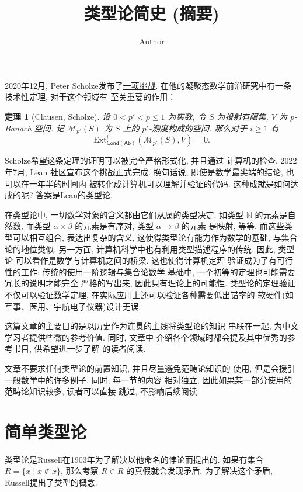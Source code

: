 \documentclass[UTF8, zihao=-4]{ctexart}
\title{类型论简史 (摘要)}
\date{}
\author{Author}
\theoremstyle{plain}
\newtheorem*{theorem}{定理}
\theoremstyle{definition}
\theoremstyle{remark}
\begin{document}
\maketitle

2020年12月, Peter Scholze发布了\href{https://xenaproject.wordpress.com/2020/12/05/liquid-tensor-experiment/}{一项挑战}.
在他的凝聚态数学前沿研究中有一条技术性定理, 对于这个领域有
至关重要的作用：
\begin{theorem}[Clausen, Scholze]
设 \(0 < p' < p \le 1\) 为实数, 令 \(S\) 为投射有限集,
\(V\) 为 \(p\)-Banach 空间. 记 \(\mathcal M_{p'}(S)\)
为 \(S\) 上的 \(p'\)-测度构成的空间. 那么对于 \(i \ge 1\) 有
\[\mathrm{Ext}_{\mathsf{Cond}(\mathsf{Ab})}^i(
  \mathcal M_{p'}(S), V
) = 0.\]
\end{theorem}
Scholze希望这条定理的证明可以被完全严格形式化, 并且通过
计算机的检查. 2022年7月, Lean
社区\href{https://leanprover-community.github.io/blog/posts/lte-final/}{宣布}这个挑战正式完成.
换句话说, 即使是数学最尖端的结论, 也可以在一年半的时间内
被转化成计算机可以理解并验证的代码.
这种成就是如何达成的呢? 答案是Lean的类型论.

在类型论中, 一切数学对象的含义都由它们从属的类型决定.
如类型 \(\mathbb N\) 的元素是自然数, 而类型 \(\alpha \times \beta\)
的元素是有序对, 类型 \(\alpha \to\beta\) 的元素
是映射, 等等. 而这些类型可以相互组合, 表达出复杂的含义,
这使得类型论有能力作为数学的基础, 与集合论的地位类似.
另一方面, 计算机科学中也有利用类型描述程序的传统. 因此, 类型论
可以看作是数学与计算机之间的桥梁. 这也使得计算机定理
验证成为了有可行性的工作: 传统的使用一阶逻辑与集合论数学
基础中, 一个初等的定理也可能需要冗长的说明才能完全
严格的写出来, 因此只有理论上的可能性.
类型论的定理验证不仅可以验证数学定理,
在实际应用上还可以验证各种需要低出错率的
软硬件(如军事、医用、宇航电子仪器)设计无误.


这篇文章的主要目的是以历史作为连贯的主线将类型论的知识
串联在一起, 为中文学习者提供些微的参考价值. 同时, 文章中
介绍各个领域时都会提及其中优秀的参考书目, 供希望进一步了解
的读者阅读.

文章不要求任何类型论的前置知识, 并且尽量避免范畴论知识的
使用, 但是会援引一般数学中的许多例子. 同时, 每一节的内容
相对独立, 因此如果某一部分使用的范畴论知识较多, 读者可以直接
跳过, 不影响后续阅读.

\section*{简单类型论}
类型论是Russell在1903年为了解决以他命名的悖论而提出的.
如果有集合 \(R = \{x \mid x \notin x\}\), 那么考察
\(R \in R\) 的真假就会发现矛盾. 为了解决这个矛盾,
Russell提出了类型的概念.
\end{document}
